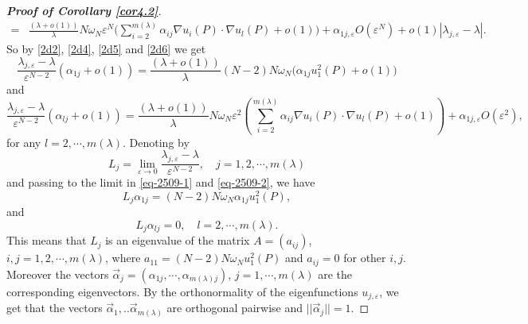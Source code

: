\documentclass[11pt,reqno]{article}
\numberwithin{equation}{section}
\newcommand\e\varepsilon
\newcommand\la\lambda
\renewcommand\o\omega
\begin{document}
\begin{proof}[\bf Proof of Corollary \ref{cor4.2}]
\begin{equation}
\begin{split}
				=&\frac{(\la+o(1))}{\la }N\o_N\e^{N}\Bigg(\sum_{i=2}^{m(\la)}\alpha_{ij}\nabla u_i(P)\cdot\nabla u_l(P)+o(1)\Bigg)+\alpha_{1j,\e}O(\e^{N})+o(1)|\lambda_{j,\e}-\lambda|.
			\end{split}
		\end{equation}
		So by \eqref{2d2}, \eqref{2d4}, \eqref{2d5} and \eqref{2d6} we get
		\begin{equation}\label{eq-2509-1}
			\frac{\lambda_{j,\e}-\la}{\e^{N-2}}(\alpha_{1j}+o(1))=\frac{(\la+o(1))}{\la }(N-2)N\o_N\Bigg(\alpha_{1j}u_1^2(P)+o(1)\Bigg)
		\end{equation}
		and 
		\begin{equation}\label{eq-2509-2}
			\frac{\lambda_{j,\e}-\la}{\e^{N-2}}(\alpha_{lj}+o(1))=\frac{(\la+o(1))}{\la }N\omega_N\e^{2}\left(\sum_{i=2}^{m(\la)}\alpha_{ij}\nabla u_i(P)\cdot\nabla u_l(P)+o(1)\right)+\alpha_{1j,\e}O(\e^{2}),
		\end{equation}
		for any $l=2,\cdots,m(\la)$.
		Denoting by 
		\begin{equation}
			L_j=\lim\limits_{\e \to 0}\frac{\lambda_{j,\e}-\la}{\e^{N-2}},\quad j=1,2,\cdots,m(\la)
		\end{equation}
		and passing to the limit in \eqref{eq-2509-1} and \eqref{eq-2509-2}, we have 
		\begin{equation}\label{eq-2509-3}
			L_j\alpha_{1j}=(N-2)N\o_N\alpha_{1j}u^2_1(P),
		\end{equation}
		and 
		\begin{equation}
			L_j\alpha_{lj}=0, \quad l=2,\cdots,m(\la).
		\end{equation}
		This means that $L_j$ is an eigenvalue of the matrix $A=(a_{ij})$, $i,j=1,2,\cdots,m(\la)$,  where $a_{11}=(N-2)N\o_Nu^2_1(P)$ and $a_{ij}=0$ for other $i,j$. Moreover the vectors $\vec{\alpha}_j=(\alpha_{1j},\cdots,\alpha_{m(\la)j})$, $j=1,\cdots,m(\la)$ are the corresponding eigenvectors. By the orthonormality of the eigenfunctions $u_{j,\e}$, we get that the vectors $\vec{\alpha}_1,..\vec{\alpha}_{m(\la)}$ are orthogonal pairwise and $||\vec{\alpha}_j||=1$. 

\end{proof}
\end{document}
